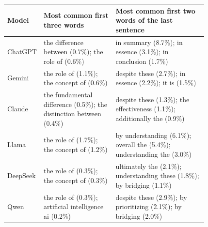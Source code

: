 \begin{tabular}{lp{0.36\linewidth}p{0.46\linewidth}}
\toprule
Model & Most common first three words & Most common first two words of the last sentence \\
\midrule
ChatGPT & the difference between (0.7\%); the role of (0.6\%) & in summary (8.7\%); in essence (3.1\%); in conclusion (1.7\%) \\
Gemini & the role of (1.1\%); the concept of (0.6\%) & despite these (2.7\%); in essence (2.2\%); it is (1.5\%) \\
Claude & the fundamental difference (0.5\%); the distinction between (0.4\%) & despite these (1.3\%); the effectiveness (1.1\%); additionally the (0.9\%) \\
Llama & the role of (1.7\%); the concept of (1.2\%) & by understanding (6.1\%); overall the (5.4\%); understanding the (3.0\%) \\
DeepSeek & the role of (0.3\%); the concept of (0.3\%) & ultimately the (2.1\%); understanding these (1.8\%); by bridging (1.1\%) \\
Qwen & the role of (0.3\%); artificial intelligence ai (0.2\%) & despite these (2.9\%); by prioritizing (2.1\%); by bridging (2.0\%) \\
\bottomrule
\end{tabular}
